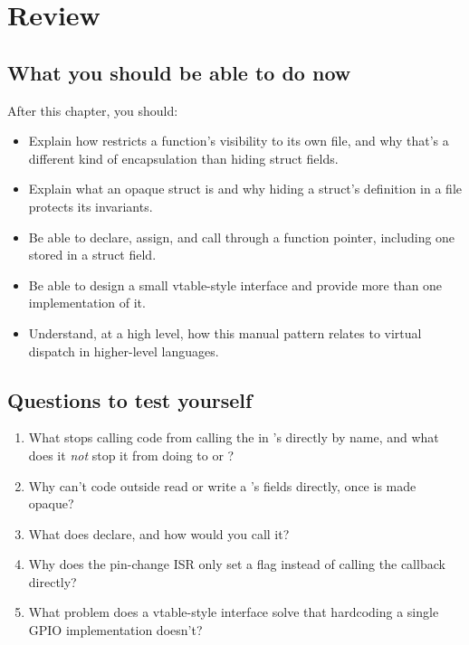 
\section{Review}
\label{c10:sec:review}

\subsection*{What you should be able to do now}
After this chapter, you should:
\begin{itemize}
  \item Explain how  restricts a function's visibility to its own file, and why that's
    a different kind of encapsulation than hiding struct fields.
  \item Explain what an opaque struct is and why hiding a struct's definition in a  file
    protects its invariants.
  \item Be able to declare, assign, and call through a function pointer, including one stored in a
    struct field.
  \item Be able to design a small vtable-style interface and provide more than one implementation
    of it.
  \item Understand, at a high level, how this manual pattern relates to virtual dispatch in
    higher-level languages.
\end{itemize}

\subsection*{Questions to test yourself}
\begin{enumerate}
  \item What stops calling code from calling the   in
    's  directly by name, and what does it \emph{not} stop it from
    doing to  or ?
  \item Why can't code outside  read or write a 's fields directly,
    once  is made opaque?
  \item What does  declare, and how would you call it?
  \item Why does the pin-change ISR only set a flag instead of calling the callback directly?
  \item What problem does a vtable-style interface solve that hardcoding a single GPIO
    implementation doesn't?
\end{enumerate}

